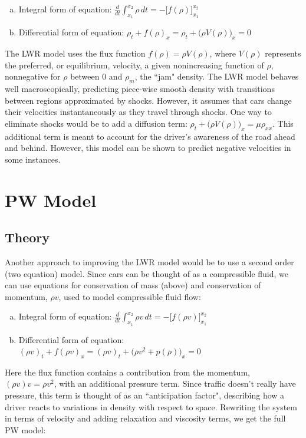 \documentclass{article}
\begin{document}
\begin{enumerate}[(a)]
\item Integral form of equation: $\displaystyle \frac{d}{dt} \int_{x_1}^{x_2} \rho \, dt = -\Big[ f( \rho ) \Big]_{x_1}^{x_2}$
\item Differential form of equation: $\rho_t + f( \rho )_x = \rho_t + \Big( \rho V(\rho) \Big)_x = 0$
\end{enumerate}

The LWR model uses the flux function $f(\rho) = \rho V(\rho)$, where $V(\rho)$ represents the preferred, or equilibrium, velocity, a given nonincreasing function of $\rho$, nonnegative for $\rho$ between 0 and $\rho_m$, the ``jam" density.  The LWR model behaves well macroscopically, predicting piece-wise smooth density with transitions between regions approximated by shocks.  However, it assumes that cars change their velocities instantaneously as they travel through shocks.  One way to eliminate shocks would be to add a diffusion term: $\rho_t + \Big(\rho V(\rho)\Big)_x = \mu \rho_{xx}$.  This additional term is meant to account for the driver's awareness of the road ahead and behind.  However, this model can be shown to predict negative velocities in some instances.  

\section{PW Model}

\subsection{Theory}
Another approach to improving the LWR model would be to use a second order (two equation) model.  Since cars can be thought of as a compressible fluid, we can use equations for conservation of mass (above) and conservation of momentum, $\rho v$, used to model compressible fluid flow:

\begin{enumerate}[(a)]
\item Integral form of equation: $\displaystyle \frac{d}{dt} \int_{x_1}^{x_2} \rho v \, dt = -\Big[ f( \rho v ) \Big]_{x_1}^{x_2}$
\item Differential form of equation: $(\rho v)_t + f( \rho v )_x = (\rho v)_t + \Big( \rho v^2 + p(\rho) \Big)_x = 0$
\end{enumerate}

Here the flux function contains a contribution from the momentum, $(\rho v)v = \rho v^2$, with an additional pressure term.  Since traffic doesn't really have pressure, this term is thought of as an ``anticipation factor", describing how a driver reacts to variations in density with respect to space. Rewriting the system in terms of velocity and adding relaxation and viscosity terms, we get the full PW model:
\end{document}
